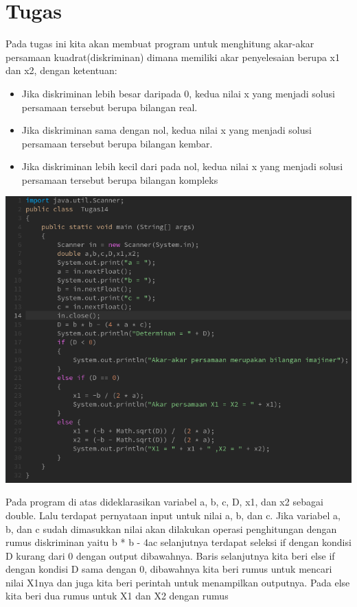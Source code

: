\documentclass[a4paper,12pt]{article}
\begin{document}
\section{Tugas}
Pada tugas ini kita akan membuat program untuk menghitung akar-akar persamaan kuadrat(diskriminan) dimana memiliki akar penyelesaian berupa x1 dan x2, dengan ketentuan:
\begin{itemize}
    \item Jika diskriminan lebih besar daripada 0, kedua nilai x yang menjadi solusi persamaan tersebut berupa bilangan real.
    \item Jika diskriminan sama dengan nol, kedua nilai x yang menjadi solusi persamaan tersebut berupa bilangan kembar.
    \item Jika diskriminan lebih kecil dari pada nol, kedua nilai x yang menjadi solusi persamaan tersebut berupa bilangan kompleks
\end{itemize}
\begin{center}
    \includegraphics[scale = 0.6]{tugas.png}
\end{center}
Pada program di atas dideklarasikan variabel a, b, c, D, x1, dan x2 sebagai double. Lalu terdapat pernyataan input untuk nilai a, b, dan c. Jika variabel a, b, dan c sudah dimasukkan nilai
akan dilakukan operasi penghitungan dengan rumus diskriminan yaitu b * b - 4ac
selanjutnya terdapat seleksi if dengan kondisi D kurang dari 0 dengan output dibawahnya. Baris selanjutnya kita beri else if dengan kondisi D sama dengan 0,
dibawahnya kita beri rumus untuk mencari nilai X1nya dan juga kita beri perintah untuk menampilkan outputnya. Pada else kita beri dua rumus untuk X1 dan X2 dengan rumus
\end{document}
